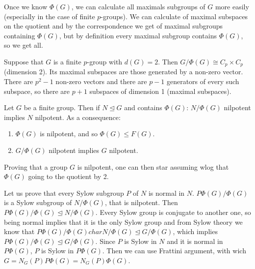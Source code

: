 \documentclass[twoside, 11pt]{article}
\begin{document}
 Once we know $\Phi(G)$, we can calculate all maximals subgroups of $G$ more easily (especially in the case of finite $p$-groups). We can calculate of maximal subspaces on the quotient and by the correspondence we get of maximal subgroups containing $\Phi(G)$, but by definition every maximal subgroup contains $\Phi(G)$, so we get all.
 

\begin{ej}
Suppose that $G$ is a finite $p$-group with $d(G)=2$. Then $G/\Phi(G)\cong C_p\times C_p$ (dimension 2). Its maximal subspaces are those generated by a non-zero vector. There are $p^2-1$ non-zero vectors and there are $p-1$ generators of every such subspace, so there are $p+1$ subspaces of dimension 1 (maximal subspaces). 
\end{ej}

\begin{teorema}
Let $G$ be a finite group. Then if $N\trianglelefteq G$ and contains $\Phi(G)$: $N/\Phi(G)$ nilpotent implies $N$ nilpotent. As a consequence:
\begin{enumerate}
\item $\Phi(G)$ is nilpotent, and so $\Phi(G)\leq F(G)$.
\item $G/\Phi(G)$ nilpotent implies $G$ nilpotent. 
\end{enumerate}
\end{teorema}
Proving that a group $G$ is nilpotent, one can then star assuming wlog that $\Phi(G)$ going to the quotient by 2. 

\begin{dem}
Let us prove that every Sylow subgroup $P$ of $N$ is normal in $N$. $P\Phi(G)/\Phi(G)$ is a Sylow subgroup of $N/\Phi(G)$, that is nilpotent. Then $P\Phi(G)/\Phi(G)\trianglelefteq N/\Phi(G)$. Every Sylow group is conjugate to another one, so being normal implies that it is the only Sylow group and from Sylow theory we know that $P\Phi(G)/\Phi(G) char N/\Phi(G)\trianglelefteq G/\Phi(G)$, which implies $P\Phi(G)/\Phi(G)\trianglelefteq G/\Phi(G)$. Since $P$ is Sylow in $N$ and it is normal in $P\Phi(G)$, $P$ is Sylow in $P\Phi(G)$. Then we can use Frattini argument, with wich $G=N_G(P)P\Phi(G)=N_G(P)\Phi(G)$. 
\end{dem}
\end{document}
